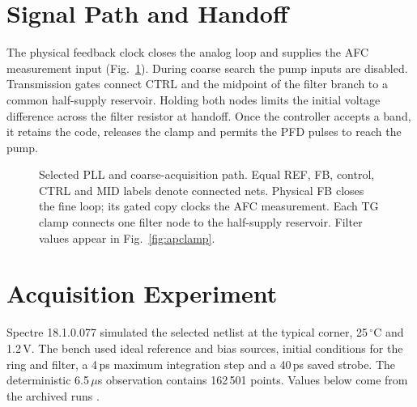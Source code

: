 \documentclass[10pt,conference,letterpaper]{IEEEtran}
\begin{document}
\section{Signal Path and Handoff}
The physical feedback clock closes the analog loop and supplies the AFC measurement input (Fig.~\ref{fig:system}). During coarse search the pump inputs are disabled. Transmission gates connect CTRL and the midpoint of the filter branch to a common half-supply reservoir. Holding both nodes limits the initial voltage difference across the filter resistor at handoff. Once the controller accepts a band, it retains the code, releases the clamp and permits the PFD pulses to reach the pump.
\begin{figure}[!t]\centering
\resizebox{.98\textwidth}{!}{}
\caption{Selected PLL and coarse-acquisition path. Equal REF, FB, control, CTRL and MID labels denote connected nets. Physical FB closes the fine loop; its gated copy clocks the AFC measurement. Each TG clamp connects one filter node to the half-supply reservoir. Filter values appear in Fig.~\ref{fig:apclamp}.}\label{fig:system}\end{figure}
\section{Acquisition Experiment}\label{sec:result}
Spectre 18.1.0.077 simulated the selected netlist at the typical corner, 25\,$^\circ$C and 1.2\,V. The bench used ideal reference and bias sources, initial conditions for the ring and filter, a 4\,ps maximum integration step and a 40\,ps saved strobe. The deterministic 6.5\,$\mu$s observation contains 162\,501 points. Values below come from the archived runs \cite{evidence}.
\end{document}
